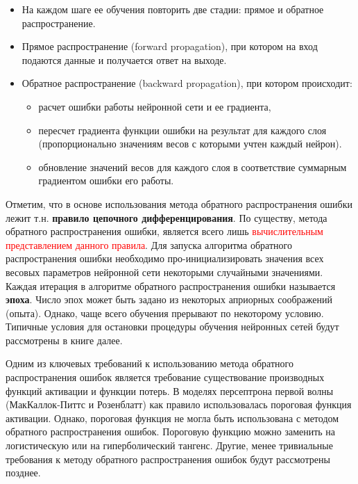 \documentclass[12pt]{article}
\begin{document}
\begin{sloppypar}
 \begin{itemize}
    \item На каждом шаге ее обучения повторить две стадии: прямое и обратное распространение.
 	\item Прямое распространение (forward propagation), при котором на вход подаются данные и получается ответ на выходе.
 	\item Обратное распространение (backward propagation), при котором происходит:
 	   \begin{itemize}
     	  \item расчет ошибки работы нейронной сети и ее градиента, 
     	  \item пересчет градиента функции ошибки на результат для каждого слоя (пропорционально значениям весов с которыми учтен каждый нейрон).
     	  \item обновление значений весов для каждого слоя в соответствие суммарным градиентом ошибки его работы.
 	   \end{itemize}
 \end{itemize}
Отметим, что в основе использования метода обратного распространения ошибки лежит т.н. 
\textbf{правило цепочного дифференцирования}. 
По существу, метода обратного распространения ошибки, является всего лишь 
\textcolor{red}{вычислительным представлением данного правила}. 
Для запуска алгоритма обратного распространения ошибки необходимо про-инициализировать значения всех весовых параметров нейронной сети некоторыми случайными значениями. Каждая итерация в алгоритме обратного распространения ошибки называется \textbf{эпоха}. 
Число эпох может быть задано из некоторых априорных соображений (опыта). Однако, чаще всего обучения прерывают по некоторому условию. Типичные условия для остановки процедуры обучения нейронных сетей будут рассмотрены в книге далее.  

Одним из ключевых требований к использованию метода обратного распространения ошибок является требование существование производных функций активации и функции потерь. В моделях персептрона первой волны (МакКаллок-Питтс и Розенблатт) как правило использовалась пороговая функция активации. Однако, пороговая функция не могла быть использована с методом обратного распространения ошибок. Пороговую функцию можно заменить на логистическую или на гиперболический тангенс. Другие, менее тривиальные требования к методу  обратного распространения ошибок будут рассмотрены позднее. 


\end{sloppypar}
\end{document}
